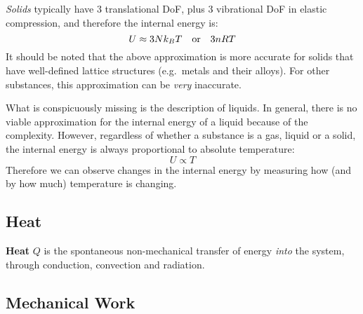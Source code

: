\emph{Solids} typically have 3 translational DoF, plus 3 vibrational DoF in
elastic compression, and therefore the internal energy is:
\begin{equation}
  U\approx3Nk_BT\quad\text{\normalsize or}\quad 3nRT
\end{equation}
It should be noted that the above approximation is more accurate for solids
that have well-defined lattice structures (e.g.\ metals and their alloys). For
other substances, this approximation can be \emph{very} inaccurate.

What is conspicuously missing is the description of liquids. In general, there
is no viable approximation for the internal energy of a liquid because of the
complexity. However, regardless of whether a substance is a gas, liquid or a
solid, the internal energy is always proportional to absolute temperature:
\begin{equation}
  U\propto T
\end{equation}
Therefore we can observe changes in the internal energy by measuring how (and
by how much) temperature is changing.



\subsection{Heat}

\textbf{Heat} {\color{blue}$Q$} is the spontaneous non-mechanical transfer of
energy \emph{into} the system, through conduction, convection and radiation.

%
%
%
%
\subsection{Mechanical Work}

